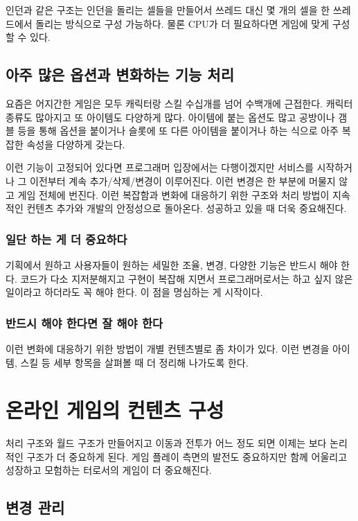 \documentclass[chapter,kosection, 10.5pt, romanfixed, a4paper]{oblivoir}
\begin{document}
인던과 같은 구조는 인던을 돌리는 셀들을 만들어서 쓰레드 대신 몇 개의 셀을 한 쓰레드에서 돌리는 방식으로
구성 가능하다. 물론 CPU가 더 필요하다면 게임에 맞게 구성할 수 있다. 

\subsection{아주 많은 옵션과 변화하는 기능 처리}

요즘은 어지간한 게임은 모두 캐릭터랑 스킬 수십개를 넘어 수백개에 근접한다. 캐릭터 종류도 많아지고
또 아이템도 다양하게 많다. 아이템에 붙는 옵션도 많고 공방이나 갬블 등을 통해 옵션을 붙이거나 
슬롯에 또 다른 아이템을 붙이거나 하는 식으로 아주 복잡한 속성을 다양하게 갖는다. 

이런 기능이 고정되어 있다면 프로그래머 입장에서는 다행이겠지만 서비스를 시작하거나 그 이전부터 
계속 추가/삭제/변경이 이루어진다. 이런 변경은 한 부분에 머물지 않고 게임 전체에 번진다. 이런 복잡함과 
변화에 대응하기 위한 구조와 처리 방법이 지속적인 컨텐츠 추가와 개발의 안정성으로 돌아온다. 성공하고 
있을 때 더욱 중요해진다. 

\subsubsection{일단 하는 게 더 중요하다}

기획에서 원하고 사용자들이 원하는 세밀한 조율, 변경, 다양한 기능은 반드시 해야 한다. 코드가 다소 지저분해지고
구현이 복잡해 지면서 프로그래머로서는 하고 싶지 않은 일이라고 하더라도 꼭 해야 한다. 이 점을 명심하는 게 
시작이다. 

\subsubsection{반드시 해야 한다면 잘 해야 한다}

이런 변화에 대응하기 위한 방법이 개별 컨텐츠별로 좀 차이가 있다. 이런 변경을 아이템, 스킬 등 세부 항목을 
살펴볼 때 더 정리해 나가도록 한다.  


\section{온라인 게임의 컨텐츠 구성}

처리 구조와 월드 구조가 만들어지고 이동과 전투가 어느 정도 되면 이제는 보다 논리적인 구조가 더 중요하게 된다. 
게임 플레이 측면의 발전도 중요하지만 함께 어울리고 성장하고 모험하는 터로서의 게임이 더 중요해진다. 


\subsection{변경 관리}
\end{document}
